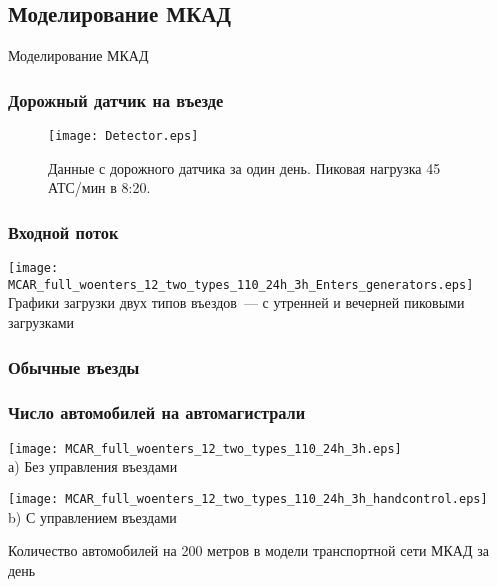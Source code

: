 \subsection{Моделирование МКАД}
\begin{frame}
    \begin{center}
        \Huge
        Моделирование МКАД
    \end{center}
\end{frame}

\begin{frame}
    \frametitle{Дорожный датчик на въезде}
    \begin{figure}[ht]
    \centering
    \texttt{[image: Detector.eps]}
    \caption{Данные с дорожного датчика за один день. Пиковая нагрузка 45 АТС/мин в 8:20.}
\end{figure}
\end{frame}

\begin{frame}
    \frametitle{Входной поток}
    \centering
    \texttt{[image: MCAR\_full\_woenters\_12\_two\_types\_110\_24h\_3h\_Enters\_generators.eps]} \\
    \hfill
    Графики загрузки двух типов въездов~--- с утренней и вечерней пиковыми загрузками
\end{frame}


\subsubsection{Обычные въезды}
\begin{frame}
    \frametitle{Число автомобилей на автомагистрали}
    \centering
    \begin{minipage}[b]{0.49\textwidth}
        \centering
        \texttt{[image: MCAR\_full\_woenters\_12\_two\_types\_110\_24h\_3h.eps]}  \\ а) Без управления въездами
    \end{minipage}
    \hfill
    \begin{minipage}[b]{0.49\textwidth}
        \centering
        \texttt{[image: MCAR\_full\_woenters\_12\_two\_types\_110\_24h\_3h\_handcontrol.eps]}  \\ b) С управлением въездами
    \end{minipage}
    \hfill
    Количество автомобилей на 200 метров в модели транспортной сети МКАД за день
\end{frame}


